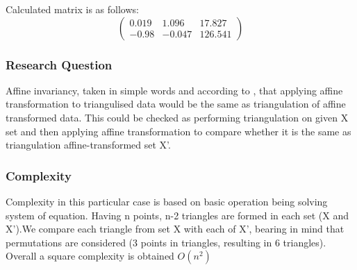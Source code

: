 \documentclass[notitlepage,english]{hgbreport}
\begin{document}
Calculated matrix is as follows:
\begin{equation}
\begin{pmatrix} 0.019 & 1.096 & 17.827 \\ -0.98 &  -0.047 & 126.541  \end{pmatrix}
\end{equation}



\subsubsection{Research Question}

Affine invariancy, taken in simple words and according to \cite{affine}, that applying affine transformation to triangulised data would be the same as triangulation  of affine transformed data. This could be checked as performing triangulation on given X set and then applying affine transformation to compare whether it is the same as triangulation affine-transformed set X'.

\subsubsection{Complexity}

Complexity in this particular case is based on basic operation being solving system of equation. Having n points, n-2 triangles are formed in each set (X and X').We compare each triangle from set X with each of X', bearing in mind that permutations are considered (3 points in triangles, resulting in 6 triangles). Overall a square complexity is obtained \(O(n^2)\)

\MakeBibliography[nosplit]
\end{document}
